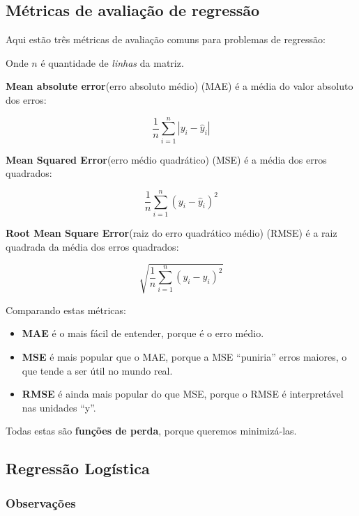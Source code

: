 \documentclass[12pt]{article}
\providecommand{\tightlist}{%
      \setlength{\itemsep}{0pt}\setlength{\parskip}{0pt}}
\begin{document}
    \hypertarget{muxe9tricas-de-avaliauxe7uxe3o-de-regressuxe3o}{%
\subsection{Métricas de avaliação de
regressão}\label{muxe9tricas-de-avaliauxe7uxe3o-de-regressuxe3o}}

Aqui estão três métricas de avaliação comuns para problemas de
regressão:

Onde \(n\) é quantidade de \emph{linhas} da matriz.

\textbf{Mean absolute error}(erro absoluto médio) (MAE) é a média do
valor absoluto dos erros:

\[\frac 1n\sum_{i=1}^n|y_i-\hat{y}_i|\]

\textbf{Mean Squared Error}(erro médio quadrático) (MSE) é a média dos
erros quadrados:

\[\frac 1n\sum_{i=1}^n(y_i-\hat{y}_i)^2\]

\textbf{Root Mean Square Error}(raiz do erro quadrático médio) (RMSE) é
a raiz quadrada da média dos erros quadrados:

\[\sqrt{\frac 1n\sum_{i=1}^n(y_i-\hat{y}_i)^2}\]

Comparando estas métricas:

\begin{itemize}
\tightlist
\item
  \textbf{MAE} é o mais fácil de entender, porque é o erro médio.
\item
  \textbf{MSE} é mais popular que o MAE, porque a MSE ``puniria'' erros
  maiores, o que tende a ser útil no mundo real.
\item
  \textbf{RMSE} é ainda mais popular do que MSE, porque o RMSE é
  interpretável nas unidades ``y''.
\end{itemize}

Todas estas são \textbf{funções de perda}, porque queremos minimizá-las.

\hypertarget{regressuxe3o-loguxedstica}{%
\subsection{\texorpdfstring{\textbf{Regressão
Logística}}{Regressão Logística}}\label{regressuxe3o-loguxedstica}}

\hypertarget{observauxe7uxf5es}{%
\subsubsection{Observações}\label{observauxe7uxf5es}}
\end{document}
